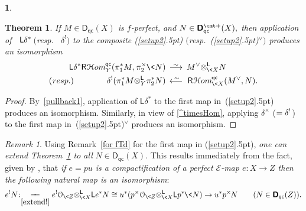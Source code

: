 \documentclass{compositio}
\theoremstyle{plain}
\newtheorem{subthm}[equation]{Theorem}
\theoremstyle{definition}
\newtheorem{cosa}[thm]{}
\theoremstyle{remark}
\newtheorem{subrem}[equation]{Remark}
\numberwithin{equation}{thm}
\begin{document}
\begin{cosa}
\begin{subthm}
\label{global4.6}
If\/ $M\in{{\boldsymbol{\mathsf{D}}}_{\mathsf{qc}}}(X)$ is\/ $f$-perfect, and\/ $N\in{{\boldsymbol{\mathsf{D}}}_{\mathsf{qc}}^{{\vbox to 0pt{\vskip-.95 ex\hbox{$\scriptstyle \text{\cmt\char'053}$}\vss}}}}(X),${} then application of\/~ ${\mkern1mu}{\mathsf L} \delta^*\!{\mkern-1mu}$ 
$($resp.~ $\delta^{!})$ to the composite\/ \textup{(\ref{setup2}{\kern.5pt})} $($resp.~\textup{(\ref{setup2}{\kern.5pt})}$^\vee)${\vspace{1pt}} produces an isomorphism{}
\begin{align*}
{\mathsf L}\delta^*{{\mathsf R}{\mkern1mu}{{\mathcal H} om}_{{Y}}^{{\mkern-1mu}{\mathsf{qc}}}}(\pi_1^*M,{\mkern1mu}\pi_2^\times {\mkern-1mu}\<N) &{{\mkern8mu\longrightarrow \mkern-25.5mu{}^\sim\mkern17mu}} M^\vee{\otimes^{\mathsf L}_{{{\mkern-1mu}\<X}}}N \\
({\kern.5pt} resp.)\qquad\qquad\delta^!(\pi_1^*M{\otimes^{\mathsf L}_{{Y}}}\pi_2^*N)&{{\mkern8mu\longleftarrow \mkern-23.5mu{}^\sim\mkern17mu}}  {{\mathsf R}{\mkern1mu}{{\mathcal H} om}_{{{\mkern-1mu}\<X}}^{{\mkern-1mu}{\mathsf{qc}}}}(M^{\vee},N) .
\end{align*}
\end{subthm}

\begin{proof}
By~\ref{pullback1}, application of ${\mathsf L}\delta^*$ to the first map in~(\ref{setup2}{\kern.5pt}) produces an isomorphism.  Similarly, in view of \eqref{^timesHom}, applying  $\delta^\times$ ($=\delta^!{\mkern1mu}$) to the first map 
in~(\ref{setup2}{\kern.5pt})$^\vee$ produces an isomorphism. 
\end{proof}

\begin{subrem} Using Remark~\ref{for fTd} 
for the first map in (\ref{setup2}{\kern.5pt}), \emph{one can extend  
Theorem~\ref{global4.6} to all} $N\in{{\boldsymbol{\mathsf{D}}}_{\mathsf{qc}}}(X)$. This results immediately
from the fact, given by \cite[Proposition 7.11]{Nm4}, that \emph{if\/ $e=pu$ is a compactification of a perfect\/ ${\mathscr{E}}$-map\/ \mbox{$e\colon X\to Z$} then the following natural map is an isomorphism}:
\[
e^!N\!:\underset{\eqref{extend!}}{=\!\!=} e^!{\mathcal O_{\<Z}}{\otimes^{\mathsf L}_{{{\mkern-1mu}\<X}}}{\mathsf L} e^*N
\cong u^*(p^\times{\mathcal O_{\<Z}}{\otimes^{\mathsf L}_{{{\mkern-1mu}\<X}}}{\mathsf L} p^*{\mkern-1mu}\<N)\to u^*p^\times{\mkern-1mu}{\mkern-1mu} N\qquad(N\in{{\boldsymbol{\mathsf{D}}}_{\mathsf{qc}}}(Z)).
\]


\end{subrem}
\end{cosa}
\end{document}
